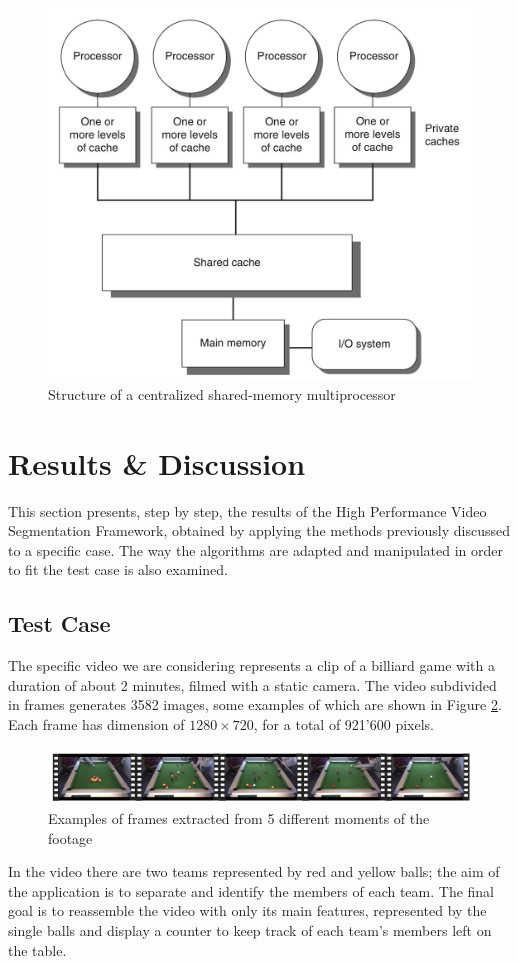 \documentclass{usiinftr}
\begin{document}
\begin{figure}[h]
	\centering
	\includegraphics[width=0.35\linewidth]{img/multiprocessing}
	\caption{Structure of a centralized shared-memory multiprocessor \cite{15}}
	\label{fig:3}
\end{figure}



\section{Results \& Discussion}
This section presents, step by step, the results of the High Performance Video Segmentation Framework, obtained by applying the methods previously discussed to a specific case. The way the algorithms are adapted and manipulated in order to fit the test case is also examined. 

\subsection{Test Case}
The specific video we are considering represents a clip of a billiard game with a duration of about 2 minutes, filmed with a static camera. The video subdivided in frames generates 3582 images, some examples of which are shown in Figure \ref{fig:4}. Each frame has dimension of $1280 \times 720$,  for a total of 921'600 pixels. \\
\begin{figure}[h]
	\centering
	\includegraphics[width=0.98\linewidth]{img/video_frames}
	\caption{Examples of frames extracted from 5 different moments of the footage}
	\label{fig:4}
\end{figure}

\noindent
In the video there are two teams represented by red and yellow balls; the aim of the application is to separate and identify the members of each team. The final goal is to reassemble the video with only its main features, represented by the single balls and display a counter to keep track of each team's members left on the table. 
\end{document}
